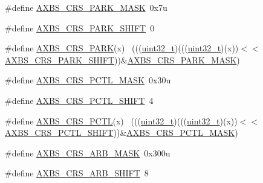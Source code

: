 \begin{DoxyCompactItemize}
\item 
\#define \hyperlink{group___a_x_b_s___register___masks_gadfcbad36cb3a462a0ddbb4fd7ec4dc6d}{A\+X\+B\+S\+\_\+\+C\+R\+S\+\_\+\+P\+A\+R\+K\+\_\+\+M\+A\+SK}~0x7u
\item 
\#define \hyperlink{group___a_x_b_s___register___masks_ga3beb82412a3e9fbd7712210fcb073d73}{A\+X\+B\+S\+\_\+\+C\+R\+S\+\_\+\+P\+A\+R\+K\+\_\+\+S\+H\+I\+FT}~0
\item 
\#define \hyperlink{group___a_x_b_s___register___masks_ga302f38bdb85280705d4d28c1d57467a2}{A\+X\+B\+S\+\_\+\+C\+R\+S\+\_\+\+P\+A\+RK}(x)                                              ~(((\hyperlink{_p_e___types_8h_a33594304e786b158f3fb30289278f5af}{uint32\+\_\+t})(((\hyperlink{_p_e___types_8h_a33594304e786b158f3fb30289278f5af}{uint32\+\_\+t})(x))$<$$<$\hyperlink{group___a_x_b_s___register___masks_ga3beb82412a3e9fbd7712210fcb073d73}{A\+X\+B\+S\+\_\+\+C\+R\+S\+\_\+\+P\+A\+R\+K\+\_\+\+S\+H\+I\+FT}))\&\hyperlink{group___a_x_b_s___register___masks_gadfcbad36cb3a462a0ddbb4fd7ec4dc6d}{A\+X\+B\+S\+\_\+\+C\+R\+S\+\_\+\+P\+A\+R\+K\+\_\+\+M\+A\+SK})
\item 
\#define \hyperlink{group___a_x_b_s___register___masks_gae9582bf93b9b0b8fa349ebb7e61ca312}{A\+X\+B\+S\+\_\+\+C\+R\+S\+\_\+\+P\+C\+T\+L\+\_\+\+M\+A\+SK}~0x30u
\item 
\#define \hyperlink{group___a_x_b_s___register___masks_ga010aca7f5f083633f9a2e1eb1e9e02e3}{A\+X\+B\+S\+\_\+\+C\+R\+S\+\_\+\+P\+C\+T\+L\+\_\+\+S\+H\+I\+FT}~4
\item 
\#define \hyperlink{group___a_x_b_s___register___masks_ga82984c98d52f5cbd1335883070044a4e}{A\+X\+B\+S\+\_\+\+C\+R\+S\+\_\+\+P\+C\+TL}(x)                                              ~(((\hyperlink{_p_e___types_8h_a33594304e786b158f3fb30289278f5af}{uint32\+\_\+t})(((\hyperlink{_p_e___types_8h_a33594304e786b158f3fb30289278f5af}{uint32\+\_\+t})(x))$<$$<$\hyperlink{group___a_x_b_s___register___masks_ga010aca7f5f083633f9a2e1eb1e9e02e3}{A\+X\+B\+S\+\_\+\+C\+R\+S\+\_\+\+P\+C\+T\+L\+\_\+\+S\+H\+I\+FT}))\&\hyperlink{group___a_x_b_s___register___masks_gae9582bf93b9b0b8fa349ebb7e61ca312}{A\+X\+B\+S\+\_\+\+C\+R\+S\+\_\+\+P\+C\+T\+L\+\_\+\+M\+A\+SK})
\item 
\#define \hyperlink{group___a_x_b_s___register___masks_ga18bef8f761d00bf46b543a96adb7eae3}{A\+X\+B\+S\+\_\+\+C\+R\+S\+\_\+\+A\+R\+B\+\_\+\+M\+A\+SK}~0x300u
\item 
\#define \hyperlink{group___a_x_b_s___register___masks_ga1b37d1aff0c53735798f6de4ead2cf16}{A\+X\+B\+S\+\_\+\+C\+R\+S\+\_\+\+A\+R\+B\+\_\+\+S\+H\+I\+FT}~8

\end{DoxyCompactItemize}
